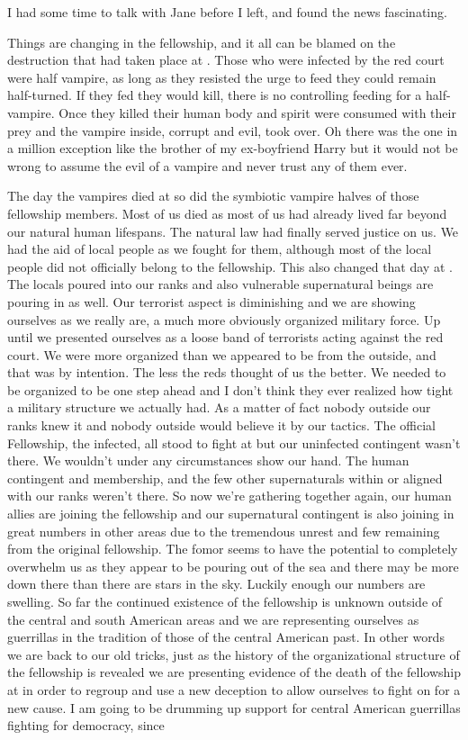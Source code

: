 I had some time to talk with Jane before I left, and found the news fascinating.

 Things are changing in the fellowship, and it all can be blamed on the destruction that had taken place at \chichenitza*. Those who were infected by the red court were half vampire, as long as they resisted the urge to feed they could remain half-turned. If they fed they would kill, there is no controlling feeding for a half-vampire. Once they killed their human body and spirit were consumed with their prey and the vampire inside, corrupt and evil, took over. Oh there was the one in a million exception like the brother of my ex-boyfriend Harry but it would not be wrong to assume the evil of a vampire and never trust any of them ever.

 The day the vampires died at \chichenitza* so did the symbiotic vampire halves of those fellowship members. Most of us died as most of us had already lived far beyond our natural human lifespans. The natural law had finally served justice on us. We had the aid of local people as we fought for them, although most of the local people did not officially belong to the fellowship. This also changed that day at \chichenitza*. The locals poured into our ranks and also vulnerable supernatural beings are pouring in as well. Our terrorist aspect is diminishing and we are showing ourselves as we really are, a much more obviously organized military force. Up until \chichenitza* we presented ourselves as a loose band of terrorists acting against the red court. We were more organized than we appeared to be from the outside, and that was by intention. The less the reds thought of us the better. We needed to be organized to be one step ahead and I don't think they ever realized how tight a military structure we actually had. As a matter of fact nobody outside our ranks knew it and nobody outside would believe it by our tactics. The official Fellowship, the infected, all stood to fight at \chichenitza* but our uninfected contingent wasn't there. We wouldn't under any circumstances show our hand. The human contingent and membership, and the few other supernaturals within or aligned with our ranks weren't there. So now we're gathering together again, our human allies are joining the fellowship and our supernatural contingent is also joining in great numbers in other areas due to the tremendous unrest and few remaining from the original fellowship. The fomor seems to have the potential to completely overwhelm us as they appear to be pouring out of the sea and there may be more down there than there are stars in the sky. Luckily enough our numbers are swelling. So far the continued existence of the fellowship is unknown outside of the central and south American areas and we are representing ourselves as guerrillas in the tradition of those of the central American past. In other words we are back to our old tricks, just as the history of the organizational structure of the fellowship is revealed we are presenting evidence of the death of the fellowship at \chichenitza* in order to regroup and use a new deception to allow ourselves to fight on for a new cause. I am going to be drumming up support for central American guerrillas fighting for democracy, since 